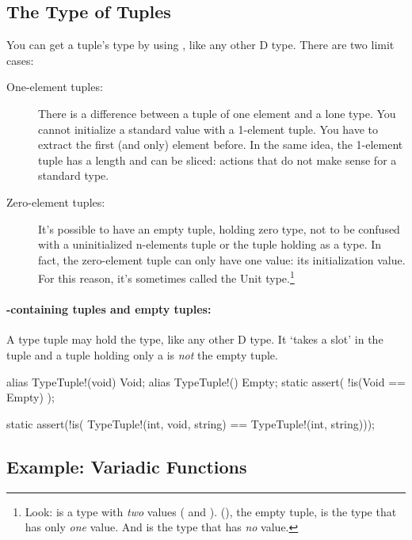 \subsection{The Type of Tuples}\label{typeoftuples}

You can get a tuple's type by using , like any other D type. There are two limit cases:

\begin{description}
\item[One-element tuples:] There is a difference between a tuple of one element and a lone type. You cannot initialize a standard value with a 1-element tuple. You have to extract the first (and only) element before. In the same idea, the 1-element tuple has a length and can be sliced: actions that do not make sense for a standard type.
\item[Zero-element tuples:] It's possible to have an empty tuple, holding zero type, not to be confused with a uninitialized n-elements tuple or the tuple holding  as a type. In fact, the zero-element tuple can only have one value: its initialization value. For this reason, it's sometimes called the Unit type.\footnote{ Look:  is a type with \emph{two} values ( and ). (), the empty tuple, is the type that has only \emph{one} value. And  is the type that has \emph{no} value.}
\end{description}

\paragraph{-containing tuples and empty tuples: } A type tuple may hold the  type, like any other D type. It `takes a slot' in the tuple and a tuple holding only a  is \emph{not} the empty tuple.

\begin{dcode}
alias TypeTuple!(void) Void;
alias TypeTuple!() Empty;
static assert( !is(Void == Empty) );

static assert(!is( TypeTuple!(int, void, string) == TypeTuple!(int, string)));
\end{dcode}

\subsection{Example: Variadic Functions}\label{variadicfunctions}

